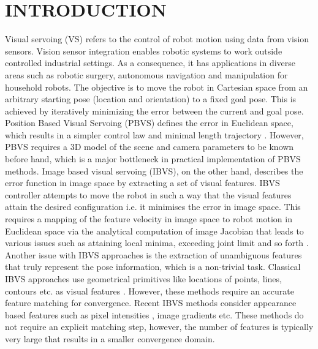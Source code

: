\documentclass[usletter, 10 pt, conference]{ieeeconf}  %
\begin{document}
\section{INTRODUCTION}
\label{sec:intro}
Visual servoing (VS) refers to the control of robot motion using data from vision sensors. Vision sensor integration enables robotic systems to work outside controlled industrial settings. As a consequence, it has applications in diverse areas such as robotic surgery, autonomous navigation and manipulation for household robots. The objective is to move the robot in Cartesian space from an arbitrary starting pose (location and orientation) to a fixed goal pose. This is achieved by iteratively minimizing the error between the current and goal pose.\\ %
\indent Position Based Visual Servoing (PBVS) defines the error in Euclidean space, which results in a simpler control law and minimal length trajectory \cite{vsbasic}. However, PBVS requires a $3$D model of the scene and camera parameters to be known before hand, which is a major bottleneck in practical implementation of PBVS methods. Image based visual servoing (IBVS), on the other hand, %
describes the error function in image space by extracting a set of visual features. IBVS controller attempts to move the robot in such a way that the visual features attain the desired configuration i.e. it minimises the error in image space.  This requires a mapping of the feature velocity in image space to robot motion in Euclidean space via the analytical computation of image Jacobian that leads to various issues such as attaining local minima, exceeding joint limit and so forth \cite{vsprob}. Another issue with IBVS approaches is the extraction of unambiguous features that truly represent the pose information, which  is a non-trivial task. Classical IBVS approaches use geometrical primitives like locations of points, lines, contours etc. as visual features \cite{vsbasic}. However, these methods require an accurate feature matching for convergence. Recent IBVS methods consider appearance based features such as pixel intensities \cite{photometricvs}, image gradients \cite{gradientvs} etc. These methods do not require an explicit matching step, however, the number of features is typically very large that results in a smaller convergence domain.\\
\end{document}
